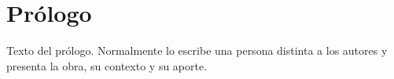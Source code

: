 
\chapter{Prólogo}

Texto del prólogo. Normalmente lo escribe una persona distinta a los autores y presenta la obra, su contexto y su aporte. \lipsum[2]
